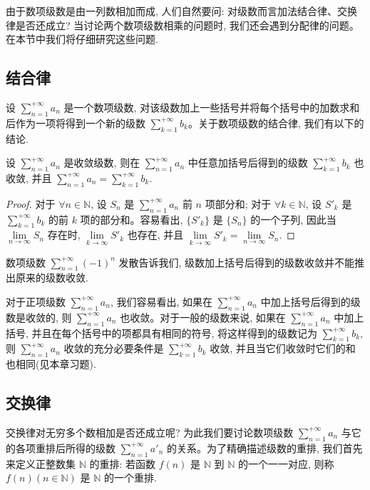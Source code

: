 由于数项级数是由一列数相加而成, 人们自然要问: 对级数而言加法结合律、交换律是否还成立? 当讨论两个数项级数相乘的问题时, 我们还会遇到分配律的问题。在本节中我们将仔细研究这些问题.

\subsection{结合律}
\label{subsec:ma-9-4-1}

设 $\sum\limits_{n=1}^{+\infty}a_n$ 是一个数项级数, 对该级数加上一些括号并将每个括号中的加数求和后作为一项将得到一个新的级数 $\sum\limits_{k=1}^{+\infty}b_k$。关于数项级数的结合律, 我们有以下的结论.

\begin{theorem}\label{theorem:ma-9-4-1}
设 $\sum\limits_{n=1}^{+\infty}a_n$ 是收敛级数, 则在 $\sum\limits_{n=1}^{+\infty}a_n$ 中任意加括号后得到的级数 $\sum\limits_{k=1}^{+\infty}b_k$ 也收敛, 并且 $\sum\limits_{n=1}^{+\infty}a_n=\sum\limits_{k=1}^{+\infty}b_k$.
\end{theorem}


\begin{proof}
对于 $\forall n\in\mathbb{N}$, 设 $S_n$ 是 $\sum\limits_{n=1}^{+\infty}a_n$ 前 $n$ 项部分和; 对于 $\forall k\in\mathbb{N}$, 设 $S'_k$ 是 $\sum\limits_{k=1}^{+\infty}b_k$ 的前 $k$ 项的部分和。容易看出, $\{S'_k\}$ 是 $\{S_n\}$ 的一个子列, 因此当 $\lim\limits_{n\to\infty}S_n$ 存在时, $\lim\limits_{k\to\infty}S'_k$ 也存在, 并且 $\lim\limits_{k\to\infty}S'_k=\lim\limits_{n\to\infty}S_n$.
\end{proof}


数项级数 $\sum\limits_{n=1}^{+\infty}(-1)^n$ 发散告诉我们, 级数加上括号后得到的级数收敛并不能推出原来的级数收敛.

对于正项级数 $\sum\limits_{n=1}^{+\infty}a_n$, 我们容易看出, 如果在 $\sum\limits_{n=1}^{+\infty}a_n$ 中加上括号后得到的级数是收敛的, 则 $\sum\limits_{n=1}^{+\infty}a_n$ 也收敛。对于一般的级数来说, 如果在 $\sum\limits_{n=1}^{+\infty}a_n$ 中加上括号, 并且在每个括号中的项都具有相同的符号, 将这样得到的级数记为 $\sum\limits_{k=1}^{+\infty}b_k$, 则 $\sum\limits_{n=1}^{+\infty}a_n$ 收敛的充分必要条件是 $\sum\limits_{k=1}^{+\infty}b_k$ 收敛, 并且当它们收敛时它们的和也相同(见本章习题).

\subsection{交换律}
\label{subsec:ma-9-4-2}

交换律对无穷多个数相加是否还成立呢? 为此我们要讨论数项级数 $\sum\limits_{n=1}^{+\infty}a_n$ 与它的各项重排后所得的级数 $\sum\limits_{n=1}^{+\infty}a'_n$ 的关系。为了精确描述级数的重排, 我们首先来定义正整数集 $\mathbb{N}$ 的重排: 若函数 $f(n)$ 是 $\mathbb{N}$ 到 $\mathbb{N}$ 的一个一一对应, 则称 $f(n)(n\in\mathbb{N})$ 是 $\mathbb{N}$ 的一个重排.

